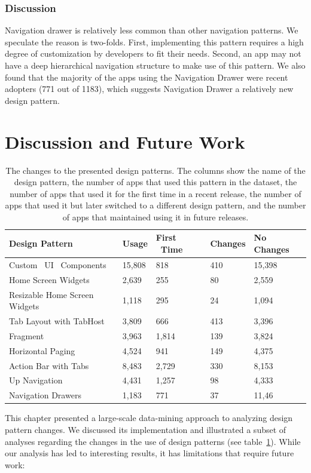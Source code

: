 \subsubsection{Discussion}
Navigation drawer is relatively less common than other navigation patterns. 
We speculate the reason is two-folds. 
First, implementing this pattern requires a high degree of customization by developers to fit their needs. Second, an app may not have a deep hierarchical navigation structure to make use of this pattern. 
We also found that the majority of the apps using the Navigation Drawer were recent adopters (771 out of 1183), which suggests Navigation Drawer a relatively new design pattern.

\section{Discussion and Future Work}
\begin{table}[!htbp]
	\begin{tabular}{| >{\centering\arraybackslash}m{6cm} | m{2cm} | m{2cm} | m{2cm} | m{2cm} |}
		\hline
		\centering Design Pattern & Usage & First \ Time & Changes & No Changes \\
		\hline
		Custom \ UI \ Components & 15,808 & 818 & 410 & 15,398 \tabularnewline
		\hline
		Home Screen Widgets & 2,639 & 255 & 80 & 2,559 \tabularnewline
		\hline
		Resizable Home Screen Widgets & 1,118 & 295 & 24 & 1,094 \tabularnewline
		\hline
		Tab Layout with TabHost & 3,809 & 666 & 413 & 3,396 \tabularnewline
		\hline
		Fragment & 3,963 & 1,814 & 139 & 3,824 \tabularnewline
		\hline
		Horizontal Paging & 4,524 & 941 & 149 & 4,375 \tabularnewline
		\hline
		Action Bar with Tabs & 8,483 & 2,729 & 330 & 8,153 \tabularnewline
		\hline
		Up Navigation & 4,431 & 1,257 & 98 & 4,333 \tabularnewline
		\hline
		Navigation Drawers & 1,183 & 771 & 37 & 11,46 \tabularnewline
		\hline
	\end{tabular}
	\caption{The changes to the presented design patterns. The columns show the name of the design pattern, the number of apps that used this pattern in the dataset, the number of apps that used it for the first time in a recent release, the number of apps that used it but later switched to a different design pattern, and the number of apps that maintained using it in future releases.}
	\label{tab:table_summary}
\end{table}

This chapter presented a large-scale data-mining approach to analyzing design pattern changes.
We discussed its implementation and illustrated a subset of analyses regarding the changes in the use of design patterns (see table~\ref{tab:table_summary}).
While our analysis has led to interesting results, it has limitations that require future work:

